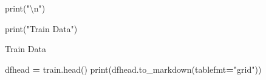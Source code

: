 \documentclass[
]{article}
\newenvironment{Shaded}{\begin{snugshade}}{\end{snugshade}}
\newcommand{\BuiltInTok}[1]{#1}
\newcommand{\CharTok}[1]{\textcolor[rgb]{0.31,0.60,0.02}{#1}}
\newcommand{\NormalTok}[1]{#1}
\newcommand{\OperatorTok}[1]{\textcolor[rgb]{0.81,0.36,0.00}{\textbf{#1}}}
\newcommand{\StringTok}[1]{\textcolor[rgb]{0.31,0.60,0.02}{#1}}
\begin{document}
\begin{Shaded}
\begin{Highlighting}[]
\BuiltInTok{print}\NormalTok{(}\StringTok{"}\CharTok{\textbackslash{}n}\StringTok{"}\NormalTok{)}
\end{Highlighting}
\end{Shaded}

\begin{Shaded}
\begin{Highlighting}[]
\BuiltInTok{print}\NormalTok{(}\StringTok{"Train Data"}\NormalTok{)}
\end{Highlighting}
\end{Shaded}

Train Data

\begin{Shaded}
\begin{Highlighting}[]
\NormalTok{dfhead }\OperatorTok{=}\NormalTok{ train.head()}
\BuiltInTok{print}\NormalTok{(dfhead.to\_markdown(tablefmt}\OperatorTok{=}\StringTok{"grid"}\NormalTok{))}
\end{Highlighting}
\end{Shaded}
\end{document}
